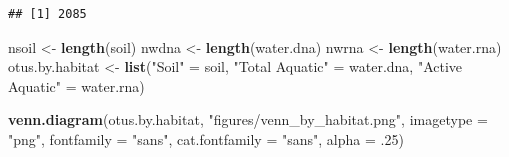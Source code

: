 \documentclass[]{article}
\newenvironment{Shaded}{\begin{snugshade}}{\end{snugshade}}
\newcommand{\DataTypeTok}[1]{\textcolor[rgb]{0.13,0.29,0.53}{#1}}
\newcommand{\DecValTok}[1]{\textcolor[rgb]{0.00,0.00,0.81}{#1}}
\newcommand{\FloatTok}[1]{\textcolor[rgb]{0.00,0.00,0.81}{#1}}
\newcommand{\KeywordTok}[1]{\textcolor[rgb]{0.13,0.29,0.53}{\textbf{#1}}}
\newcommand{\NormalTok}[1]{#1}
\newcommand{\OperatorTok}[1]{\textcolor[rgb]{0.81,0.36,0.00}{\textbf{#1}}}
\newcommand{\StringTok}[1]{\textcolor[rgb]{0.31,0.60,0.02}{#1}}
\begin{document}
\begin{Shaded}
\end{Shaded}

\begin{verbatim}
## [1] 2085
\end{verbatim}

\begin{Shaded}
\begin{Highlighting}[]
\NormalTok{nsoil <-}\StringTok{ }\KeywordTok{length}\NormalTok{(soil)}
\NormalTok{nwdna <-}\StringTok{ }\KeywordTok{length}\NormalTok{(water.dna)}
\NormalTok{nwrna <-}\StringTok{ }\KeywordTok{length}\NormalTok{(water.rna)}
\NormalTok{otus.by.habitat <-}\StringTok{ }\KeywordTok{list}\NormalTok{(}\StringTok{"Soil"}\NormalTok{ =}\StringTok{ }\NormalTok{soil, }\StringTok{"Total Aquatic"}\NormalTok{ =}\StringTok{ }\NormalTok{water.dna, }\StringTok{"Active Aquatic"}\NormalTok{ =}\StringTok{ }\NormalTok{water.rna)}

\KeywordTok{venn.diagram}\NormalTok{(otus.by.habitat, }\StringTok{"figures/venn_by_habitat.png"}\NormalTok{, }
             \DataTypeTok{imagetype =} \StringTok{"png"}\NormalTok{, }
             \DataTypeTok{fontfamily =} \StringTok{"sans"}\NormalTok{, }
             \DataTypeTok{cat.fontfamily =} \StringTok{"sans"}\NormalTok{,}
             \DataTypeTok{alpha =} \FloatTok{.25}\NormalTok{)}
\end{Highlighting}
\end{Shaded}
\end{document}
